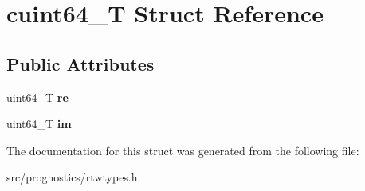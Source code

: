 \hypertarget{structcuint64__T}{}\section{cuint64\+\_\+T Struct Reference}
\label{structcuint64__T}
\subsection*{Public Attributes}
\begin{DoxyCompactItemize}
\item 
\mbox{\label{structcuint64__T_acfad207710754a82c8bb77696f8c0cbb}} 
uint64\+\_\+T {\bfseries re}
\item 
\mbox{\label{structcuint64__T_a811c315faf4e20010cb9b3a4de265028}} 
uint64\+\_\+T {\bfseries im}
\end{DoxyCompactItemize}


The documentation for this struct was generated from the following file\+:\begin{DoxyCompactItemize}
\item 
src/prognostics/rtwtypes.\+h\end{DoxyCompactItemize}
